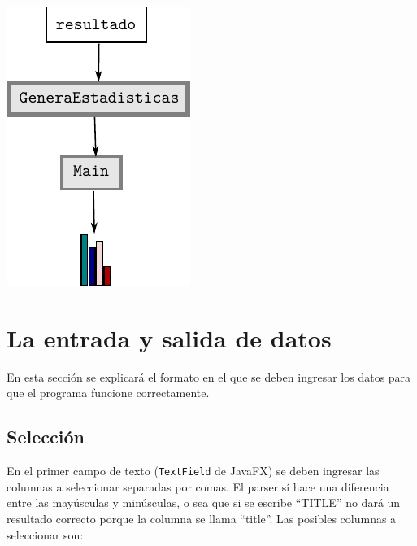 \documentclass{article}
\begin{document}
\begin{center}
\includegraphics[scale=1]{estadisticas}
\end{center}

\section{La entrada y salida de datos}

En esta sección se explicará el formato en el que se deben ingresar los datos para que el programa funcione correctamente.

\subsection{Selección}

En el primer campo de texto (\texttt{TextField} de JavaFX) se deben ingresar las columnas a seleccionar separadas por comas. El parser sí hace una diferencia entre las mayúsculas y minúsculas, o sea que si se escribe ``TITLE'' no dará un resultado correcto porque la columna se llama ``title''. Las posibles columnas a seleccionar son:
\end{document}
